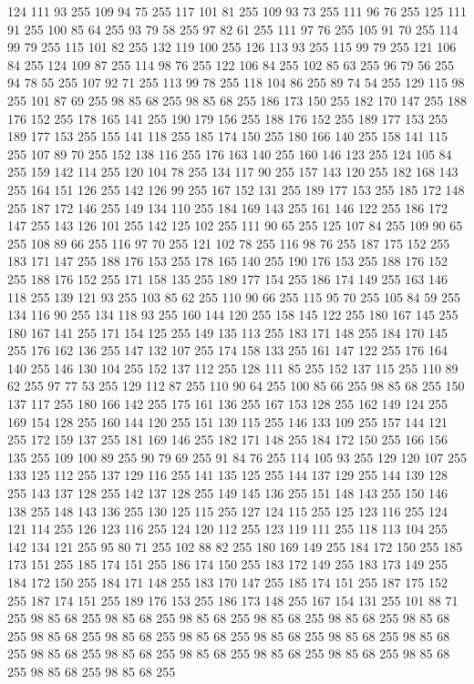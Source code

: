 124 111 93 255 109 94 75 255 117 101 81 255 109 93 73 255 111 96 76 255 125 111 91 255 100 85 64 255 93 79 58 255 97 82 61 255 111 97 76 255 105 91 70 255 114 99 79 255 115 101 82 255 132 119 100 255 126 113 93 255 115 99 79 255 121 106 84 255 124 109 87 255 114 98 76 255 122 106 84 255 102 85 63 255 96 79 56 255 94 78 55 255 107 92 71 255 113 99 78 255 118 104 86 255 89 74 54 255 129 115 98 255 101 87 69 255 98 85 68 255 98 85 68 255 186 173 150 255 182 170 147 255 188 176 152 255 178 165 141 255 190 179 156 255 188 176 152 255 189 177 153 255 189 177 153 255 155 141 118 255 185 174 150 255 180 166 140 255 158 141 115 255 107 89 70 255 152 138 116 255 176 163 140 255 160 146 123 255 124 105 84 255 159 142 114 255 120 104 78 255 134 117 90 255 157 143 120 255 182 168 143 255 164 151 126 255 142 126 99 255 167 152 131 255 189 177 153 255 185 172 148 255 187 172 146 255 149 134 110 255 184 169 143 255 161 146 122 255 186 172 147 255 143 126 101 255
142 125 102 255 111 90 65 255 125 107 84 255 109 90 65 255 108 89 66 255 116 97 70 255 121 102 78 255 116 98 76 255 187 175 152 255 183 171 147 255 188 176 153 255 178 165 140 255 190 176 153 255 188 176 152 255 188 176 152 255 171 158 135 255 189 177 154 255 186 174 149 255 163 146 118 255 139 121 93 255 103 85 62 255 110 90 66 255 115 95 70 255 105 84 59 255 134 116 90 255 134 118 93 255 160 144 120 255 158 145 122 255 180 167 145 255 180 167 141 255 171 154 125 255 149 135 113 255 183 171 148 255 184 170 145 255 176 162 136 255 147 132 107 255 174 158 133 255 161 147 122 255 176 164 140 255 146 130 104 255 152 137 112 255 128 111 85 255 152 137 115 255 110 89 62 255 97 77 53 255 129 112 87 255 110 90 64 255 100 85 66 255 98 85 68 255 150 137 117 255 180 166 142 255 175 161 136 255 167 153 128 255 162 149 124 255 169 154 128 255 160 144 120 255 151 139 115 255 146 133 109 255 157 144 121 255 172 159 137 255 181 169 146 255 182 171 148 255 184 172 150 255 166 156 135 255
109 100 89 255 90 79 69 255 91 84 76 255 114 105 93 255 129 120 107 255 133 125 112 255 137 129 116 255 141 135 125 255 144 137 129 255 144 139 128 255 143 137 128 255 142 137 128 255 149 145 136 255 151 148 143 255 150 146 138 255 148 143 136 255 130 125 115 255 127 124 115 255 125 123 116 255 124 121 114 255 126 123 116 255 124 120 112 255 123 119 111 255 118 113 104 255 142 134 121 255 95 80 71 255 102 88 82 255 180 169 149 255 184 172 150 255 185 173 151 255 185 174 151 255 186 174 150 255 183 172 149 255 183 173 149 255 184 172 150 255 184 171 148 255 183 170 147 255 185 174 151 255 187 175 152 255 187 174 151 255 189 176 153 255 186 173 148 255 167 154 131 255 101 88 71 255 98 85 68 255 98 85 68 255 98 85 68 255 98 85 68 255 98 85 68 255 98 85 68 255 98 85 68 255 98 85 68 255 98 85 68 255 98 85 68 255 98 85 68 255 98 85 68 255 98 85 68 255 98 85 68 255 98 85 68 255 98 85 68 255 98 85 68 255 98 85 68 255 98 85 68 255 98 85 68 255
